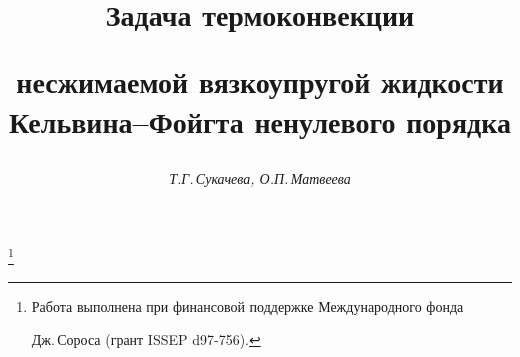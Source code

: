









\newcommand{\R}{{\mathrm I}\!{\mathrm R}}


\newcommand{\up}[2]{\overset{#1}{#2}{}}


\newcommand{\col}{\operatorname{col}}


\newcommand{\diag}{\operatorname{diag}}


\newcommand{\dom}{\operatorname{dom}}


\newcommand{\const}{\operatorname{const}}


\newcommand{\im}{\operatorname{im}}


\renewcommand{\baselinestretch}{0.97}


\newcommand{\tts}[1]{}







\setcounter{page}{46}















\author{\it Т.Г.\,Сукачева, О.П.\,Матвеева}




\title{Задача термоконвекции


несжимаемой вязкоупругой жидкости Кельвина--Фойгта ненулевого порядка}


\thanks{Работа выполнена при финансовой поддержке Международного фонда


Дж.\,Сороса (грант ISSEP d97-756).}





